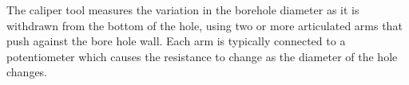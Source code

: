 \begin{enumerate}
\vspace{1em}

The caliper tool measures the variation in the borehole diameter as it
is withdrawn from the bottom of the hole, using two or more
articulated arms that push against the bore hole wall. Each arm is
typically connected to a potentiometer which causes the resistance to
change as the diameter of the hole changes.



\end{enumerate}


 
